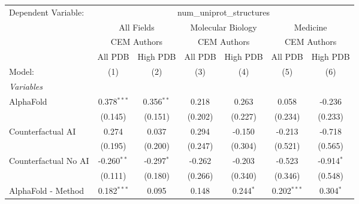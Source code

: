\begingroup
\centering
\begin{tabular}{lcccccc}
   \tabularnewline \midrule \midrule
   Dependent Variable: & \multicolumn{6}{c}{num\_uniprot\_structures}\\
 & \multicolumn{2}{c}{All Fields} & \multicolumn{2}{c}{Molecular Biology} & \multicolumn{2}{c}{Medicine} \\
\cmidrule(lr){2-3} \cmidrule(lr){4-5} \cmidrule(lr){6-7}
 & \multicolumn{2}{c}{CEM Authors} & \multicolumn{2}{c}{CEM Authors} & \multicolumn{2}{c}{CEM Authors} \\
\cmidrule(lr){2-3} \cmidrule(lr){4-5} \cmidrule(lr){6-7}
 & \multicolumn{1}{c}{All PDB} & \multicolumn{1}{c}{High PDB} & \multicolumn{1}{c}{All PDB} & \multicolumn{1}{c}{High PDB} & \multicolumn{1}{c}{All PDB} & \multicolumn{1}{c}{High PDB} \\
\cmidrule(lr){2-2} \cmidrule(lr){3-3} \cmidrule(lr){4-4} \cmidrule(lr){5-5} \cmidrule(lr){6-6} \cmidrule(lr){7-7}
   Model:                                                     & (1)            & (2)           & (3)            & (4)            & (5)            & (6)\\  
   \midrule
   \emph{Variables}\\
   AlphaFold                                                  & 0.378$^{***}$  & 0.356$^{**}$  & 0.218          & 0.263          & 0.058          & -0.236\\   
                                                              & (0.145)        & (0.151)       & (0.202)        & (0.227)        & (0.234)        & (0.233)\\   
   Counterfactual AI                                          & 0.274          & 0.037         & 0.294          & -0.150         & -0.213         & -0.718\\   
                                                              & (0.195)        & (0.200)       & (0.247)        & (0.304)        & (0.521)        & (0.565)\\   
   Counterfactual No AI                                       & -0.260$^{**}$  & -0.297$^{*}$  & -0.262         & -0.203         & -0.523         & -0.914$^{*}$\\   
                                                              & (0.111)        & (0.180)       & (0.266)        & (0.340)        & (0.346)        & (0.548)\\   
   AlphaFold - Method                                         & 0.182$^{***}$  & 0.095         & 0.148          & 0.244$^{*}$    & 0.202$^{***}$  & 0.304$^{*}$\\   

\end{tabular}
